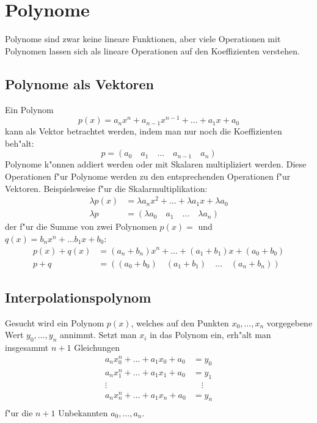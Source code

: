 \chapter{Polynome\label{chapter-polynome}}
Polynome sind zwar keine lineare Funktionen, aber viele 
Operationen mit Polynomen lassen sich als lineare Operationen
auf den Koeffizienten verstehen.

\section{Polynome als Vektoren}
Ein Polynom 
$$p(x)=a_nx^n+a_{n-1}x^{n-1}+\dots+a_1x +a_0$$
kann als Vektor betrachtet werden, indem man nur noch die Koeffizienten
beh"alt:
$$p=(
a_0\quad a_1\quad \dots\quad a_{n-1}\quad a_n
)
$$
Polynome k"onnen addiert werden oder mit Skalaren multipliziert
werden.
Diese Operationen f"ur Polynome werden zu den entsprechenden Operationen
f"ur Vektoren. Beispielsweise f"ur die Skalarmultiplikation:
\begin{align*}
\lambda p(x)&=\lambda a_nx^2+\dots +\lambda a_1x+\lambda a_0
\\
\lambda p&=(\lambda a_0\quad a_1\quad \dots\quad \lambda a_n)
\end{align*}
der f"ur die Summe von zwei Polynomen
$p(x)=$ und $q(x)=b_nx^n+\dots b_1x+b_0$:
\begin{align*}
p(x)+q(x)&=(a_n+b_n)x^n+\dots+(a_1+b_1)x+(a_0+b_0)\\
p+q&=((a_0+b_0)\quad(a_1+b_1)\quad\dots\quad (a_n+b_n))
\end{align*}

\section{Interpolationspolynom}
Gesucht wird ein Polynom $p(x)$, welches auf den Punkten $x_0,\dots,x_n$
vorgegebene Wert $y_0,\dots,y_n$ annimmt. Setzt man $x_i$ in das Polynom
ein, erh"alt man insgesammt $n+1$ Gleichungen
\begin{align*}
a_nx_0^n+\dots+a_1x_0+a_0&=y_0\\
a_nx_1^n+\dots+a_1x_1+a_0&=y_1\\
\vdots&\quad\vdots\\
a_nx_n^n+\dots+a_1x_n+a_0&=y_n\\
\end{align*}
f"ur die $n+1$ Unbekannten $a_0,\dots,a_n$.



